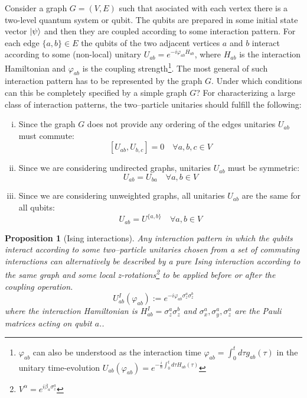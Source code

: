 \documentclass[10pt,a4paper]{book}
\numberwithin{equation}{chapter}
\numberwithin{figure}{chapter}
\numberwithin{table}{chapter}
\newtheorem{prop}{Proposition}[section]
\begin{document}
Consider a graph $G=(V,E)$ such that asociated with each vertex there is a two-level quantum system or qubit. The qubits are prepared in some initial state vector $\ket{\psi}$ and then they are coupled according to some interaction pattern. For each edge $\lbrace a,b \rbrace \in E$ the qubits of the two adjacent vertices $a$ and $b$ interact according to some (non-local) unitary $U_{ab} = e^{-i \varphi_{ab} H_{ab}}$, where $H_{ab}$ is the interaction Hamiltonian and $\varphi_{ab}$ is the coupling strength\footnote{$\varphi_{ab}$ can also be understood as the interaction time $\varphi_{ab}=\int^{t}_{0}d\tau g_{ab}(\tau)$ in the unitary time-evolution $U_{ab}\left(\varphi_{ab}\right)=e^{-\frac{i}{\hbar}\int^{t}_{0}d\tau H_{ab}(\tau)}$}. The most general of such interaction pattern has to be represented by the graph $G$.
Under which conditions can this be completely specified by a simple graph $G$?
For characterizing a large class of interaction patterns, the two–particle unitaries should fulfill the following: 
\begin{enumerate}[(i)]
\item Since the graph $G$ does not provide any ordering of the edges unitaries $U_{ab}$ must commute:
\begin{equation}
\left[ U_{ab},U_{b,c} \right]=0 \quad \forall a,b,c \in V 
\end{equation}
\item Since we are considering undirected graphs, unitaries $U_{ab}$ must be symmetric:
\begin{equation}
U_{ab}=U_{ba} \quad \forall a,b \in V
\end{equation}
\item Since we are considering unweighted graphs, all unitaries $U_{ab}$ are the same for all qubits:
\begin{equation}
U_{ab}=U^{\lbrace a,b \rbrace} \quad \forall a,b \in V
\end{equation}
\end{enumerate}

\begin{prop}[Ising interactions] Any interaction pattern in which the qubits interact according to some two–particle unitaries chosen from a set of commuting interactions can alternatively be described by a pure Ising interaction according to the same graph and some local z-rotations\footnote{$V^{\alpha}=e^{i\beta_a \sigma^{a}_{z}}$} to be applied before or after the coupling operation.
\begin{equation}
U^{I}_{ab}(\varphi_{ab}):=e^{-i\varphi_{ab}\sigma^{a}_{z}\sigma^{b}_{z}}
\end{equation}
where the interaction Hamiltonian is $H^{I}_{ab}=\sigma^{a}_{z}\sigma^{b}_{z}$ and $\sigma^{a}_{x},\sigma^{a}_{y},\sigma^{a}_{z}$ are the Pauli matrices acting on qubit $a$..
\end{prop}
\end{document}
